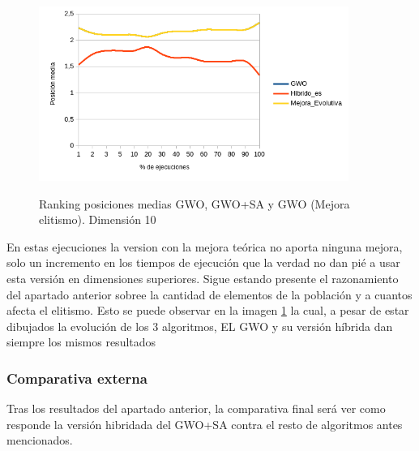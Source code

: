 \documentclass[a4paper]{report}
\begin{document}





\begin{figure}[H]
    \centering
    \caption{Ranking posiciones medias GWO, GWO+SA y GWO (Mejora elitismo). Dimensión 10}
    \includegraphics[width=0.9\textwidth]{Resultados/Analisis_final/D30/GWO/Grafico_puestos.png}
    \label{img:aaaaaaaaaaaaaaaaaaaaaaa}

\end{figure}


En estas ejecuciones la version con la mejora teórica no aporta ninguna mejora, solo un incremento en los tiempos de ejecución que la verdad no dan pié a usar esta versión en dimensiones superiores. Sigue estando presente el razonamiento del apartado anterior sobree la cantidad de elementos de la población y a cuantos afecta el elitismo. Esto se puede observar en la imagen \ref{img:aaaaaaaaaaaaaaaaaaaaaaa} la cual, a pesar de estar dibujados la evolución de los 3 algoritmos, EL GWO y su versión híbrida dan siempre los mismos resultados


\subsubsection{Comparativa externa}

Tras los resultados del apartado anterior, la comparativa final será ver como responde la versión hibridada del GWO+SA contra el resto de algoritmos antes mencionados.




\end{document}
